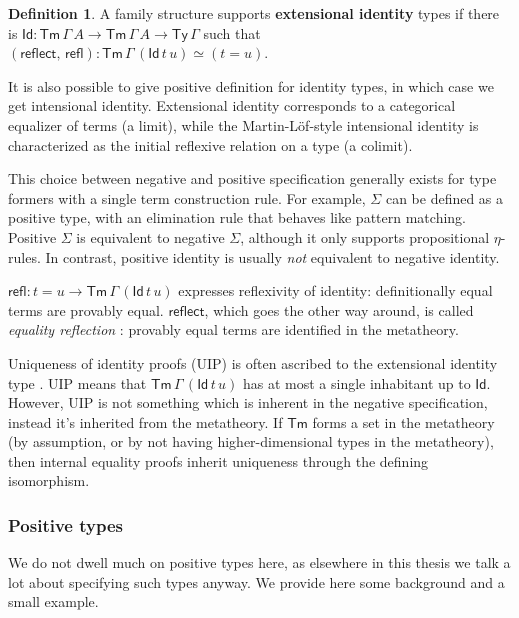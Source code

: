 \documentclass[12pt,a4paper,twoside,openany]{book}
\theoremstyle{remark}
\theoremstyle{definition}
\newtheorem{mydefinition}{Definition}
\newcommand{\refl}{\mathsf{refl}}
\newcommand{\reflect}{\mathsf{reflect}}
\newcommand{\Tm}{\mathsf{Tm}}
\newcommand{\Ty}{\mathsf{Ty}}
\newcommand{\Id}{\mathsf{Id}}
\begin{document}
\begin{mydefinition}
A family structure supports \textbf{extensional identity} types if there is $\Id
: \Tm\,\Gamma\,A \to \Tm\,\Gamma\,A \to \Ty\,\Gamma$ such that
$(\reflect,\,\refl) : \Tm\,\Gamma\,(\Id\,t\,u) \simeq (t = u)$.
\end{mydefinition}

It is also possible to give positive definition for identity types, in which
case we get intensional identity. Extensional identity corresponds to a
categorical equalizer of terms (a limit), while the Martin-Löf-style intensional
identity is characterized as the initial reflexive relation on a type (a
colimit).

This choice between negative and positive specification generally exists for
type formers with a single term construction rule. For example, $\Sigma$ can be
defined as a positive type, with an elimination rule that behaves like pattern
matching. Positive $\Sigma$ is equivalent to negative $\Sigma$, although it only
supports propositional $\eta$-rules. In contrast, positive identity is usually
\emph{not} equivalent to negative identity.

$\refl : t = u \to \Tm\,\Gamma\,(\Id\,t\,u)$ expresses reflexivity of identity:
definitionally equal terms are provably equal. $\reflect$, which goes the other
way around, is called \emph{equality reflection} \cite{TODO}: provably equal
terms are identified in the metatheory.

Uniqueness of identity proofs (UIP) is often ascribed to the extensional
identity type \cite{TODO}. UIP means that $\Tm\,\Gamma\,(\Id\,t\,u)$ has at most
a single inhabitant up to $\Id$. However, UIP is not something which is inherent
in the negative specification, instead it's inherited from the metatheory. If
$\Tm$ forms a set in the metatheory (by assumption, or by not having
higher-dimensional types in the metatheory), then internal equality proofs
inherit uniqueness through the defining isomorphism.

\subsubsection{Positive types}

We do not dwell much on positive types here, as elsewhere in this thesis we talk
a lot about specifying such types anyway. We provide here some background and
a small example.
\end{document}
